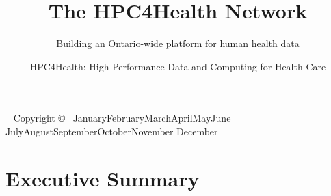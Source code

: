 \documentclass[twoside,symmetric,sfsidenotes,notoc]{tufte-book}
\title{The HPC4Health Network}
\subtitle{Building an Ontario-wide platform for human health data}
\author{HPC4Health: High-Performance Data and Computing for Health Care}
\newcommand{\monthyear}{%
  \ifcase\month\or January\or February\or March\or April\or May\or June\or
  July\or August\or September\or October\or November\or
  December\fi\space\number\year
}
\begin{document}
\frontmatter

\maketitle


\newpage
\begin{fullwidth}
~\vfill
\thispagestyle{empty}
\setlength{\parindent}{0pt}
\setlength{\parskip}{\baselineskip}
Copyright \copyright\ \monthyear
\par{}
\par{}
\end{fullwidth}

\cleardoublepage
\chapter*{Executive Summary}
\end{document}
